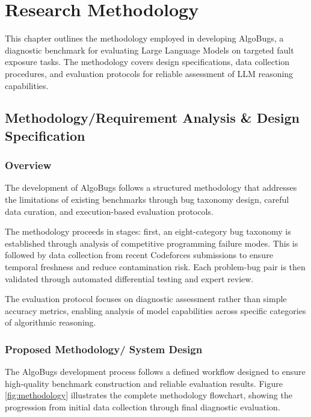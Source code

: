 \chapter{Research Methodology}

This chapter outlines the methodology employed in developing AlgoBugs, a diagnostic benchmark for evaluating Large Language Models on targeted fault exposure tasks. The methodology covers design specifications, data collection procedures, and evaluation protocols for reliable assessment of LLM reasoning capabilities.

\section{Methodology/Requirement Analysis \& Design Specification}
\subsection{Overview}

The development of AlgoBugs follows a structured methodology that addresses the limitations of existing benchmarks through bug taxonomy design, careful data curation, and execution-based evaluation protocols.

The methodology proceeds in stages: first, an eight-category bug taxonomy is established through analysis of competitive programming failure modes. This is followed by data collection from recent Codeforces submissions to ensure temporal freshness and reduce contamination risk. Each problem-bug pair is then validated through automated differential testing and expert review.

The evaluation protocol focuses on diagnostic assessment rather than simple accuracy metrics, enabling analysis of model capabilities across specific categories of algorithmic reasoning.

\subsection{Proposed Methodology/ System Design}

The AlgoBugs development process follows a defined workflow designed to ensure high-quality benchmark construction and reliable evaluation results. Figure \ref{fig:methodology} illustrates the complete methodology flowchart, showing the progression from initial data collection through final diagnostic evaluation.

